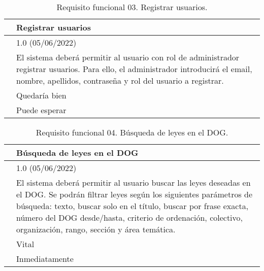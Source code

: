 \begin{table}[H]
\begin{center}
\begin{tabular}{|p{3cm}|p{10cm}|} \hline
\centering {\bf FRQ-03} & Registrar usuarios  \\ \hline\hline
\centering {\bf Versión} & 1.0 (05/06/2022) \\ \hline
\centering {\bf Descripción} & El sistema deberá permitir al usuario con rol de administrador registrar usuarios. Para ello, el administrador introducirá el email, nombre, apellidos, contraseña y rol del usuario a registrar. \\ \hline
\centering {\bf Importancia} & Quedaría bien \\ \hline
\centering {\bf Urgencia} & Puede esperar \\ \hline
\end{tabular}
\caption{Requisito funcional 03. Registrar usuarios.}
\label{enlaceFRQ3}
\end{center}
\end{table}

\begin{table}[H]
\begin{center}
\begin{tabular}{|p{3cm}|p{10cm}|} \hline
\centering {\bf FRQ-04} & Búsqueda de leyes en el DOG  \\ \hline\hline
\centering {\bf Versión} & 1.0 (05/06/2022) \\ \hline
\centering {\bf Descripción} & El sistema deberá permitir al usuario buscar las leyes deseadas en el DOG. Se podrán filtrar leyes según los siguientes parámetros de búsqueda: texto, buscar solo en el título, buscar por frase exacta, número del DOG desde/hasta, criterio de ordenación, colectivo, organización, rango, sección y área temática. \\ \hline
\centering {\bf Importancia} & Vital \\ \hline
\centering {\bf Urgencia} & Inmediatamente \\ \hline
\end{tabular}
\caption{Requisito funcional 04. Búsqueda de leyes en el DOG.}
\label{enlaceFRQ4}
\end{center}
\end{table}

